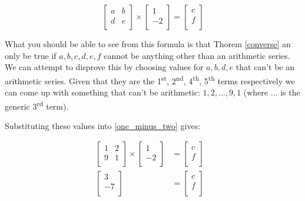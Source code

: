\documentclass[12pt]{article}
\newcommand{\theoremref}[1]{Thorem \ref{#1}}
\begin{document}
	\begin{equation}\label{one_minus_two}
		\left [ \begin{array}{cc} 
			a & b \\
			d & e \\
		\end{array} \right ] \times
		\left [ \begin{array}{c}
			1 \\
			-2 \\
		\end{array}\right ] = 
		\left [ \begin{array}{c}
			c \\
			f \\
		\end{array}\right ]
	\end{equation}

	What you should be able to see from this formula is that \theoremref{converse} an only be true if \(a, b, c, d, e, f\) cannot be anything other than an arithmetic series. We can attempt to disprove this by choosing values for \(a, b, d, e\) that can't be an arithmetic series. Given that they are the 1\textsuperscript{st}, 2\textsuperscript{nd}, 4\textsuperscript{th}, 5\textsuperscript{th} terms respectively we can come up with something that can't be arithmetic: \(1, 2, ..., 9, 1\) (where \(...\) is the generic 3\textsuperscript{rd} term).
	
	Substituting these values into \eqref{one_minus_two} gives:
	
		
	\begin{align}
		\left [ \begin{array}{cc} 
			1 & 2 \\
			9 & 1 \\
		\end{array} \right ] \times
		\left [ \begin{array}{c}
			1 \\
			-2 \\
		\end{array}\right ] &= 
		\left [ \begin{array}{c}
			c \\
			f \\
		\end{array}\right ] &\\
		\left [ \begin{array}{c}
			3 \\
			-7 \\
		\end{array}\right ] &= 
		\left [ \begin{array}{c}
			c \\
			f \\
		\end{array}\right ]
	\end{align}
	
\end{document}
